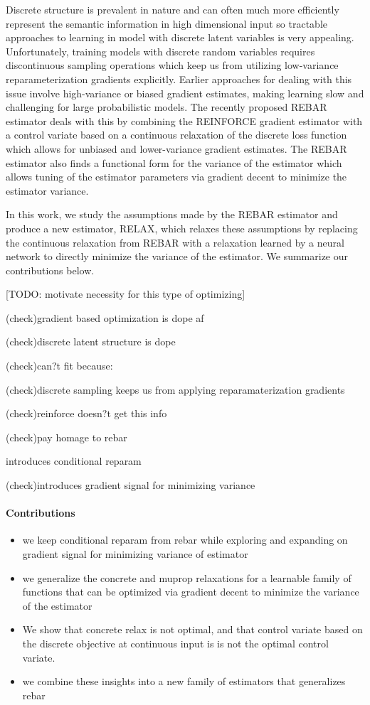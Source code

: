\documentclass{article}
\begin{document}
Discrete structure is prevalent in nature and can often much more efficiently represent the semantic information in high dimensional input so tractable approaches to learning in model with discrete latent variables is very appealing.
Unfortunately, training models with discrete random variables requires discontinuous sampling operations which keep us from utilizing low-variance reparameterization gradients explicitly.
Earlier approaches for dealing with this issue involve high-variance or biased gradient estimates, making learning slow and challenging for large probabilistic models.
The recently proposed REBAR estimator deals with this by combining the REINFORCE gradient estimator with a control variate based on a continuous relaxation of the discrete loss function which allows for unbiased and lower-variance gradient estimates.
The REBAR estimator also finds a functional form for the variance of the estimator which allows tuning of the estimator parameters via gradient decent to minimize the estimator variance. 

In this work, we study the assumptions made by the REBAR estimator and produce a new estimator, RELAX, which relaxes these assumptions by replacing the continuous relaxation from REBAR with a relaxation learned by a neural network to directly minimize the variance of the estimator.
We summarize our contributions below. 


[TODO: motivate necessity for this type of optimizing]

(check)gradient based optimization is dope af

(check)discrete latent structure is dope

(check)can?t fit because:

(check)discrete sampling keeps us from applying reparamaterization gradients 

(check)reinforce doesn?t get this info

(check)pay homage to rebar

introduces conditional reparam

(check)introduces gradient signal for minimizing variance




\paragraph{Contributions}
\begin{itemize}
\item we keep conditional reparam from rebar while exploring and expanding on gradient signal for minimizing variance of estimator
\item we generalize the concrete and muprop relaxations for a learnable family of functions that can be optimized via gradient decent to minimize the variance of the estimator
\item We show that concrete relax is not optimal, and that control variate based on the discrete objective at continuous input is is not the optimal control variate.
\item we combine these insights into a new family of estimators that generalizes rebar
\end{itemize}
\end{document}
